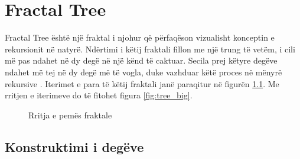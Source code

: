 \chapter{Fractal Tree}

\noindent Fractal Tree është një fraktal i njohur që përfaqëson vizualisht konceptin e rekursionit në natyrë. Ndërtimi i këtij fraktali fillon me një trung të vetëm, i cili më pas ndahet në dy degë në një kënd të caktuar. Secila prej këtyre degëve ndahet më tej në dy degë më të vogla, duke vazhduar këtë proces në mënyrë rekursive \cite{fractal_geometry}. Iterimet e para të këtij fraktali janë  paraqitur në figurën \ref{fig:tree_grow}. Me rritjen e iterimeve do të fitohet figura \ref{fig:tree_big}.

\begin{figure}[htbp!]
\centering
{}
\caption{Rritja e pemës fraktale}
\label{fig:tree_grow}
\end{figure}

\section{Konstruktimi i degëve}


